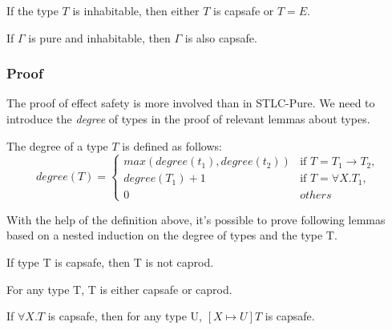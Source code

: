 \begin{lemma}
  If the type $T$ is inhabitable, then either $T$ is capsafe or $T = E$.
\end{lemma}

\begin{theorem}
  If $\Gamma$ is pure and inhabitable, then $\Gamma$ is also capsafe.
\end{theorem}


\subsubsection{Proof}

The proof of effect safety is more involved than in STLC-Pure. We need
to introduce the \emph{degree} of types in the proof of
relevant lemmas about types.

\begin{definition}
  The degree of a type $T$ is defined as follows:
  \begin{equation*}
    degree(T) =
    \begin{cases}
      max(degree(t_1), degree(t_2)) & \text{if } T = T_1 \to T_2,\\
      degree(T_1) + 1 & \text{if } T = \forall X.T_1,\\
      0 & others
    \end{cases}
  \end{equation*}
\end{definition}

With the help of the definition above, it's possible to prove
following lemmas based on a nested induction on the degree of types
and the type T.

\begin{lemma}
 If type T is capsafe, then T is not caprod.
\end{lemma}

\begin{lemma}
 For any type T, T is either capsafe or caprod.
\end{lemma}

\begin{lemma}
  If $\forall X.T$ is capsafe, then for any type U, $[X \mapsto U]T$
  is capsafe.
\end{lemma}

